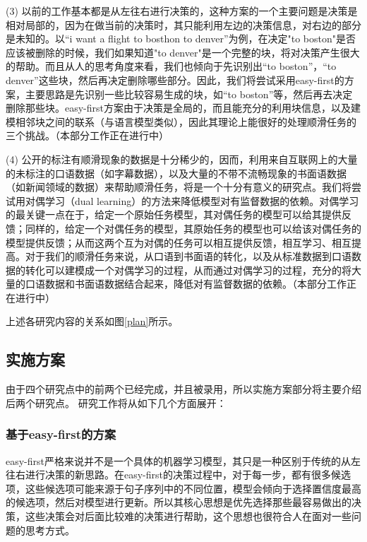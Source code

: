 (3)
以前的工作基本都是从左往右进行决策的，这种方案的一个主要问题是决策是相对局部的，因为在做当前的决策时，其只能利用左边的决策信息，对右边的部分是未知的。以“i want a flight to bosthon to denver”为例，在决定"to boston"是否应该被删除的时候，我们如果知道"to denver"是一个完整的块，将对决策产生很大的帮助。而且从人的思考角度来看，我们也倾向于先识别出“to boston”，“to denver”这些块，然后再决定删除哪些部分。因此，我们将尝试采用easy-first的方案，主要思路是先识别一些比较容易生成的块，如“to boston”等，然后再去决定删除那些块。easy-first方案由于决策是全局的，而且能充分的利用块信息，以及建模相邻块之间的联系（与语言模型类似），因此其理论上能很好的处理顺滑任务的三个挑战。（本部分工作正在进行中）

(4)
公开的标注有顺滑现象的数据是十分稀少的，因而，利用来自互联网上的大量的未标注的口语数据（如字幕数据），以及大量的不带不流畅现象的书面语数据（如新闻领域的数据）来帮助顺滑任务，将是一个十分有意义的研究点。我们将尝试用对偶学习（dual learning）的方法来降低模型对有监督数据的依赖。对偶学习的最关键一点在于，给定一个原始任务模型，其对偶任务的模型可以给其提供反馈；同样的，给定一个对偶任务的模型，其原始任务的模型也可以给该对偶任务的模型提供反馈；从而这两个互为对偶的任务可以相互提供反馈，相互学习、相互提高。对于我们的顺滑任务来说，从口语到书面语的转化，以及从标准数据到口语数据的转化可以建模成一个对偶学习的过程，从而通过对偶学习的过程，充分的将大量的口语数据和书面语数据结合起来，降低对有监督数据的依赖。（本部分工作正在进行中）


上述各研究内容的关系如图\ref{plan}所示。



\subsection{实施方案}
由于四个研究点中的前两个已经完成，并且被录用，所以实施方案部分将主要介绍后两个研究点。
研究工作将从如下几个方面展开：
\subsubsection{基于easy-first的方案}
easy-first严格来说并不是一个具体的机器学习模型，其只是一种区别于传统的从左往右进行决策的新思路。在easy-first的决策过程中，对于每一步，都有很多候选项，这些候选项可能来源于句子序列中的不同位置，模型会倾向于选择置信度最高的候选项，然后对模型进行更新。所以其核心思想是优先选择那些最容易做出的决策，这些决策会对后面比较难的决策进行帮助，这个思想也很符合人在面对一些问题的思考方式。

